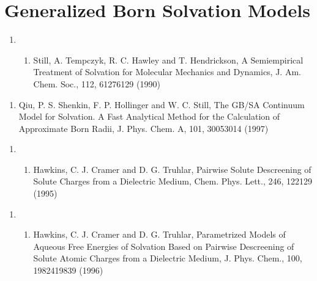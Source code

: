 \documentclass[letterpaper,11pt,english]{sphinxmanual}
\begin{document}
\section{Generalized Born Solvation Models}
\label{\detokenize{text/references:generalized-born-solvation-models}}\begin{enumerate}
%
\setcounter{enumi}{22}
\item {} \begin{enumerate}
%
\setcounter{enumii}{2}
\item {} 
Still, A. Tempczyk, R. C. Hawley and T. Hendrickson, A Semiempirical Treatment of Solvation for Molecular Mechanics and Dynamics, J. Am. Chem. Soc., 112, 6127\sphinxhyphen{}6129 (1990)

\end{enumerate}

\end{enumerate}
\begin{enumerate}
%
\setcounter{enumi}{3}
\item {} 
Qiu, P. S. Shenkin, F. P. Hollinger and W. C. Still, The GB/SA Continuum Model for Solvation. A Fast Analytical Method for the Calculation of Approximate Born Radii, J. Phys. Chem. A, 101, 3005\sphinxhyphen{}3014 (1997)

\end{enumerate}
\begin{enumerate}
%
\setcounter{enumi}{6}
\item {} \begin{enumerate}
%
\setcounter{enumii}{3}
\item {} 
Hawkins, C. J. Cramer and D. G. Truhlar, Pairwise Solute Descreening of Solute Charges from a Dielectric Medium, Chem. Phys. Lett., 246, 122\sphinxhyphen{}129 (1995)

\end{enumerate}

\end{enumerate}
\begin{enumerate}
%
\setcounter{enumi}{6}
\item {} \begin{enumerate}
%
\setcounter{enumii}{3}
\item {} 
Hawkins, C. J. Cramer and D. G. Truhlar, Parametrized Models of Aqueous Free Energies of Solvation Based on Pairwise Descreening of Solute Atomic Charges from a Dielectric Medium, J. Phys. Chem., 100, 19824\sphinxhyphen{}19839 (1996)

\end{enumerate}

\end{enumerate}
\end{document}
